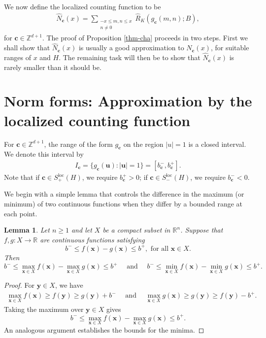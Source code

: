 \documentclass[reqno, 11pt]{amsart}
\renewcommand{\leq}{\leqslant}
\renewcommand{\geq}{\geqslant}
\newtheorem{lemma}[theorem]{Lemma}
\theoremstyle{definition}
\theoremstyle{definition}
\renewcommand{\geq}{\geqslant}
\renewcommand{\leq}{\leqslant}
\newcommand{\RR}{\mathbb{R}}
\newcommand{\cc}{\mathbf{c}}
\newcommand{\uu}{\mathbf{u}}
\newcommand{\xx}{\mathbf{x}}
\newcommand{\yy}{\mathbf{y}}
\newcommand{\ZZ}{\mathbb{Z}}
\numberwithin{equation}{section}
\begin{document}
We now define the localized counting function to be
\begin{align}\label{def-lcf}
	\hat{N}_\cc(x) = \sum_{\substack{-x \leq m, n \leq x \\ n \neq 0}} \hat{R}_K(g_\cc(m, n); B),
\end{align}
for $\cc \in \ZZ^{d+1}$. The proof of Proposition \ref{thm-cha} proceeds in two steps. First we shall show that $\hat{N}_\cc(x)$ is usually a good approximation to $N_\cc(x)$, for suitable ranges of $x$ and $H$. The remaining task will then be to show that $\hat{N}_\cc(x)$ is rarely smaller than it should be.










\section{Norm forms: Approximation by the localized counting function}

For $\cc \in \ZZ^{d+1}$, the range of the form $g_\cc$ on the region $|u| = 1$ is a closed interval. We denote this interval by
\begin{align}
	I_\cc = \{ g_\cc(\uu): |\uu| = 1 \} = [b^-_\cc, b^+_\cc].
\end{align}
Note that if $\cc \in S_+^{\mathrm{loc}}(H)$, we require $b^+_\cc > 0$; if $\cc \in S_-^{\mathrm{loc}}(H)$, we require $b^-_\cc < 0$. 

We begin with a simple lemma that controls the difference in the maximum (or minimum) of two continuous functions when they differ by a bounded range at each point.
\begin{lemma}\label{min-max}
	Let $n \geq 1$ and let $X$ be a compact subset in $\RR^n$. Suppose that $f, g: X \rightarrow \RR$ are continuous functions satisfying
	$$b^- \leq f(\xx) - g(\xx) \leq b^+, \text{ for all } \xx \in X.$$
	Then
	$$b^- \leq \max_{\xx \in X} f(\xx) - \max_{\xx \in X}g(\xx) \leq b^+ \quad \text{ and } \quad b^- \leq \min_{\xx \in X} f(\xx) - \min_{\xx \in X}g(\xx) \leq b^+.$$
\end{lemma}
\begin{proof}
	For $\yy \in X$, we have
	\begin{align*}
		\max_{\xx \in X} f(\xx) \geq f(\yy) \geq g(\yy) + b^- \quad \text{ and } \quad \max_{\xx \in X} g(\xx) \geq g(\yy) \geq f(\yy) - b^+.
	\end{align*}
	Taking the maximum over $\yy \in X$ gives $$b^- \leq \max_{\xx \in X} f(\xx) - \max_{\xx \in X}g(\xx) \leq b^+.$$
	An analogous argument establishes the bounds for the minima.
\end{proof}
\end{document}
